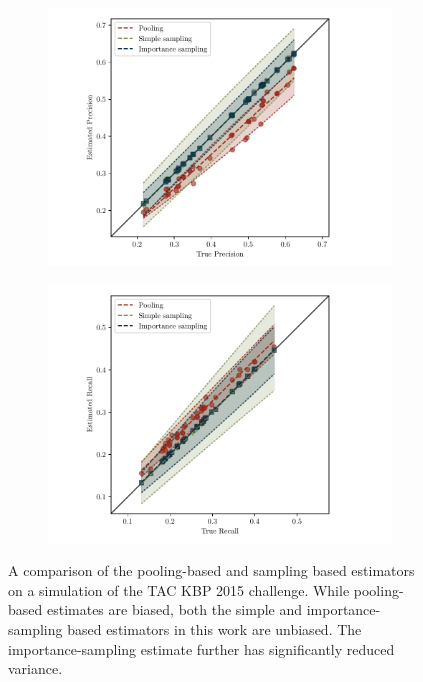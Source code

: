 \begin{figure}[t]
  \centering
  \begin{subfigure}{0.49\textwidth}
    \includegraphics[width=\textwidth]{figures/simulation/simulation-p}
  \end{subfigure}
  \begin{subfigure}{0.49\textwidth}
    \includegraphics[width=\textwidth]{figures/simulation/simulation-r}
  \end{subfigure}
  \caption{\label{fig:simulation}
  A comparison of the pooling-based and sampling based estimators on a simulation of the TAC KBP 2015 challenge.
  While pooling-based estimates are biased, both the simple and importance-sampling based estimators in this work are unbiased.
  The importance-sampling estimate further has significantly reduced variance. 
  }
\end{figure}

